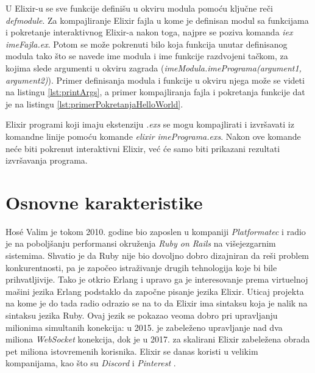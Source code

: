 \documentclass[12pt,oneside]{memoir}
\begin{document}


\noindent U Elixir-u se sve funkcije definišu u okviru modula pomoću ključne reči \textit{defmodule}. Za kompajliranje Elixir fajla u kome je definisan modul sa funkcijama i pokretanje interaktivnog Elixir-a nakon toga, najpre se poziva komanda \textit{iex imeFajla.ex}. Potom se može pokrenuti bilo koja funkcija unutar definisanog modula tako što se navede ime modula i ime funkcije razdvojeni tačkom, za kojima slede argumenti u okviru zagrada (\textit{imeModula.imePrograma(argument1, argument2)}). Primer definisanja modula i funkcije u okviru njega može se videti na listingu \ref{lst:printArgs}, a primer kompajliranja fajla i pokretanja funkcije dat je na listingu \ref{lst:primerPokretanjaHelloWorld}.





Elixir programi koji imaju ekstenziju \textit{.exs} se mogu kompajlirati i izvršavati iz komandne linije pomoću komande \textit{elixir imePrograma.exs}. Nakon ove komande neće biti pokrenut interaktivni Elixir, već će samo biti prikazani rezultati izvršavanja programa.

\section{Osnovne karakteristike}

Hosé Valim je tokom 2010. godine bio zaposlen u kompaniji \textit{Platformatec} \cite{Platformatec} i radio je na poboljšanju performansi okruženja
\textit{Ruby on Rails} na višejezgarnim sistemima. Shvatio je da Ruby nije bio dovoljno dobro dizajniran da reši problem konkurentnosti, pa je započeo istraživanje drugih tehnologija koje bi bile prihvatljivije. Tako je otkrio Erlang i upravo ga je interesovanje prema virtuelnoj mašini jezika Erlang podstaklo da započne pisanje jezika Elixir. Uticaj projekta na kome je do tada radio odrazio se na to da Elixir ima sintaksu koja je nalik na sintaksu jezika Ruby. Ovaj jezik se pokazao veoma dobro pri upravljanju
milionima simultanih konekcija: u 2015. je zabeleženo upravljanje nad dva miliona \textit{WebSocket} konekcija, dok je u 2017. za skalirani Elixir zabeležena obrada pet miliona istovremenih korisnika. Elixir se danas koristi u velikim kompanijama, kao što su \textit{Discord}  i \textit{Pinterest} \cite{HistoryOfElixir}.
\end{document}
